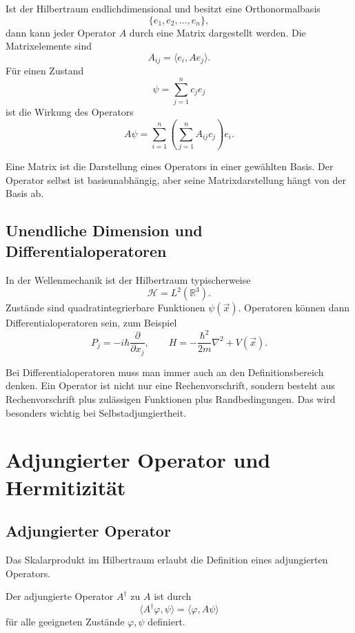 Ist der Hilbertraum endlichdimensional und besitzt eine Orthonormalbasis
\[
    \{e_1,e_2,\dots,e_n\},
\]
dann kann jeder Operator $A$ durch eine Matrix dargestellt werden. Die Matrixelemente sind
\[
    A_{ij}=\langle e_i,Ae_j\rangle.
\]
Für einen Zustand
\[
    \psi=\sum_{j=1}^n c_j e_j
\]
ist die Wirkung des Operators
\[
    A\psi=\sum_{i=1}^n \left(\sum_{j=1}^n A_{ij}c_j\right)e_i.
\]

\begin{conceptbox}
Eine Matrix ist die Darstellung eines Operators in einer gewählten Basis. Der Operator selbst ist basisunabhängig, aber seine Matrixdarstellung hängt von der Basis ab.
\end{conceptbox}

\subsection{Unendliche Dimension und Differentialoperatoren}

In der Wellenmechanik ist der Hilbertraum typischerweise
\[
    \mathcal H=L^2(\mathbb R^3).
\]
Zustände sind quadratintegrierbare Funktionen $\psi(\vec x)$. Operatoren können dann Differentialoperatoren sein, zum Beispiel
\[
    P_j=-i\hbar\frac{\partial}{\partial x_j},
    \qquad
    H=-\frac{\hbar^2}{2m}\nabla^2+V(\vec x).
\]

\begin{notebox}
Bei Differentialoperatoren muss man immer auch an den Definitionsbereich denken. Ein Operator ist nicht nur eine Rechenvorschrift, sondern besteht aus Rechenvorschrift plus zulässigen Funktionen plus Randbedingungen. Das wird besonders wichtig bei Selbstadjungiertheit.
\end{notebox}

\section{Adjungierter Operator und Hermitizität}

\subsection{Adjungierter Operator}

Das Skalarprodukt im Hilbertraum erlaubt die Definition eines adjungierten Operators.

\begin{definitionbox}
Der adjungierte Operator $A^\dagger$ zu $A$ ist durch
\[
    \langle A^\dagger\varphi,\psi\rangle
    =\langle \varphi,A\psi\rangle
\]
für alle geeigneten Zustände $\varphi,\psi$ definiert.
\end{definitionbox}

